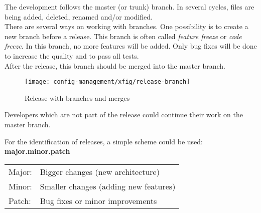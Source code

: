 The development follows the master (or trunk) branch. In several
cycles, files are being added, deleted, renamed and/or modified.\\

There are several ways on working with branches. One possibility is to
create a new branch before a release. This branch is often called
\emph{feature freeze} or \emph{code freeze}. In this branch, no more
features will be added. Only bug fixes will be done to increase the quality
and to pass all tests.\\
After the release, this branch should be merged into the master branch.

\begin{figure}[H]
\begin{center}
  \texttt{[image: config-management/xfig/release-branch]}
\end{center}
\caption{Release with branches and merges}
\end{figure}
Developers which are not part of the release could continue their work on
the master branch.\\

\vspace{3mm}

\newslide
For the identification of releases, a simple scheme could be used:
{\bfseries major.minor.patch}

\begin{tabular}{ll}
Major: & Bigger changes (new architecture)\\
Minor: & Smaller changes (adding new features)\\
Patch: & Bug fixes or minor improvements\\
\end{tabular}

\newpage
